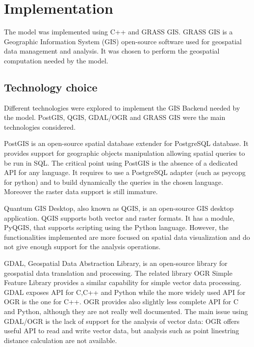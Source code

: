 \documentclass[12pt,a4paper,twoside]{book}
\begin{document}
\chapter{Implementation}\label{implementation}
The model was implemented using C++ and GRASS GIS. GRASS GIS is a Geographic Information System (GIS) open-source software used for geospatial data management and analysis. It was chosen to perform the geospatial computation needed by the model.

\section{Technology choice}
Different technologies were explored to implement the GIS Backend needed by the model. PostGIS, QGIS, GDAL/OGR and GRASS GIS were the main technologies considered.

PostGIS is an open-source spatial database extender for PostgreSQL database. It provides support for geographic objects manipulation allowing spatial queries to be run in SQL. The critical point using PostGIS is the absence of a dedicated API for any language. It requires to use a PostgreSQL adapter (such as psycopg for python) and to build dynamically the queries in the chosen language. Moreover the raster data support is still immature.

Quantum GIS Desktop, also known as QGIS, is an open-source GIS desktop application. QGIS supports both vector and raster formats. It has a module, PyQGIS, that supports scripting using the Python language. However, the functionalities implemented are more focused on spatial data visualization and do not give enough support for the analysis operations.

GDAL, Geospatial Data Abstraction Library, is an open-source library for geospatial data translation and processing. The related library OGR Simple Feature Library provides a similar capability for simple vector data processing. GDAL exposes API for C,C++ and Python while the more widely used API for OGR is the one for C++. OGR provides also slightly less complete API for C and Python, although they are not really well documented. The main issue using GDAL/OGR is the lack of support for the analysis of vector data: OGR offers useful API to read and write vector data, but analysis such as point linestring distance calculation are not available.
\end{document}
